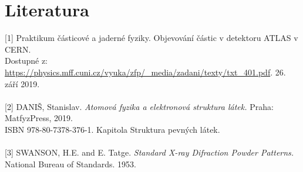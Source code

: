 \documentclass[10pt,a4paper]{article}
\newcommand{\°}{\degree}
\begin{document}
\section{Literatura}
[1] Praktikum částicové a jaderné fyziky. Objevování částic v detektoru ATLAS v CERN. \\ Dostupné z: \url{https://physics.mff.cuni.cz/vyuka/zfp/_media/zadani/texty/txt_401.pdf}. 26. září 2019.
\\\\
{}[2] DANIŠ, Stanislav. \textit{Atomová fyzika a elektronová struktura látek.} Praha: MatfyzPress, 2019. \\ ISBN 978-80-7378-376-1. Kapitola Struktura pevných látek.
\\\\
{}[3] SWANSON, H.E. and E. Tatge. \textit{Standard X-ray Difraction Powder Patterns.} National Bureau of Standards. 1953.
\end{document}
